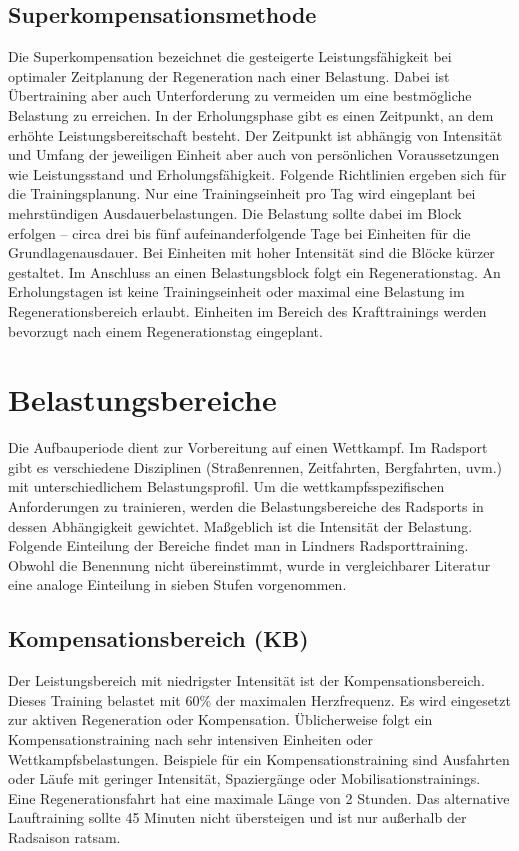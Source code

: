 \subsection{Superkompensationsmethode}
Die Superkompensation bezeichnet die gesteigerte Leistungsfähigkeit bei optimaler Zeitplanung der Regeneration nach einer Belastung.\cite[163]{Trainingswissenschaft} Dabei ist Übertraining aber auch Unterforderung zu vermeiden um eine bestmögliche Belastung zu erreichen. In der Erholungsphase gibt es einen Zeitpunkt, an dem erhöhte Leistungsbereitschaft besteht. Der Zeitpunkt ist abhängig von Intensität und Umfang der jeweiligen Einheit aber auch von persönlichen Voraussetzungen wie Leistungsstand und Erholungsfähigkeit. \newline
Folgende Richtlinien ergeben sich für die Trainingsplanung. \cite[44-46]{Radsporttraining} Nur eine Trainingseinheit pro Tag wird eingeplant bei mehrstündigen Ausdauerbelastungen. Die Belastung sollte dabei im Block erfolgen -- circa drei bis fünf aufeinanderfolgende Tage bei Einheiten für die Grundlagenausdauer. Bei Einheiten mit hoher Intensität sind die Blöcke kürzer gestaltet. Im Anschluss an einen Belastungsblock folgt ein Regenerationstag. An Erholungstagen ist keine Trainingseinheit oder maximal eine Belastung im Regenerationsbereich erlaubt. Einheiten im Bereich des Krafttrainings werden bevorzugt nach einem Regenerationstag eingeplant. \cite[60]{Radsporttraining}


\section{Belastungsbereiche}
\label{grundlagen:sport:belastungsbereiche}
 \newline
Die Aufbauperiode dient zur Vorbereitung auf einen Wettkampf. Im Radsport gibt es verschiedene Disziplinen (Straßenrennen, Zeitfahrten, Bergfahrten, uvm.) mit unterschiedlichem Belastungsprofil. Um die wettkampfsspezifischen Anforderungen zu trainieren, werden die Belastungsbereiche des Radsports in dessen Abhängigkeit gewichtet. Maßgeblich ist die Intensität der Belastung. Folgende Einteilung der Bereiche findet man in Lindners Radsporttraining. \cite[31-39]{Radsporttraining} Obwohl die Benennung nicht übereinstimmt, wurde in vergleichbarer Literatur \cite[27]{Ausdauertrainer} eine analoge Einteilung in sieben Stufen vorgenommen. 
\subsection{Kompensationsbereich (KB)}
Der Leistungsbereich mit niedrigster Intensität ist der Kompensationsbereich. Dieses Training belastet mit 60\% der maximalen Herzfrequenz. Es wird eingesetzt zur aktiven Regeneration oder Kompensation. Üblicherweise folgt ein Kompensationstraining nach sehr intensiven Einheiten oder Wettkampfsbelastungen. Beispiele für ein Kompensationstraining sind Ausfahrten oder Läufe mit geringer Intensität, Spaziergänge oder Mobilisationstrainings. \cite[31-32]{Radsporttraining}
Eine Regenerationsfahrt hat eine maximale Länge von 2 Stunden. Das alternative Lauftraining sollte 45 Minuten nicht übersteigen und ist nur außerhalb der Radsaison ratsam.
